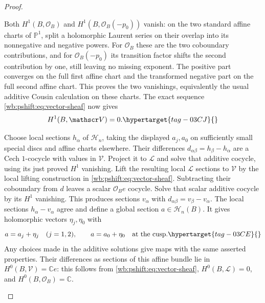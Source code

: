 \begin{proof}
\begin{enumerate}[label=\arabic*.,leftmargin=*]
Both $H^1(B,\mathcal O_B)$ and
$H^1(B,\mathcal O_B(-p_0))$ vanish: on the two standard affine
charts of $\mathbb P^1$, split a holomorphic Laurent series on
their overlap into its nonnegative and negative powers. For
$\mathcal O_B$ these are the two coboundary contributions, and
for $\mathcal O_B(-p_0)$ its transition factor shifts the second
contribution by one, still leaving no missing exponent. The positive
part converges on the full first affine chart and the transformed
negative part on the full second affine chart. This proves the two
vanishings, equivalently the usual additive Cousin calculation on
these charts. The exact sequence \eqref{wb:pshift:eq:vector-sheaf} now gives
\begin{equation}
                             H^1(B,\mathscr V)=0.
 \hypertarget{tag-03CJ}{}\label{wb:pshift:eq:no-analytic-obstruction}
\end{equation}

Choose
local sections $h_\alpha$ of $\mathscr H_n$, taking the displayed
$a_j,a_0$ on sufficiently small special discs and affine charts
elsewhere. Their differences $d_{\alpha\beta}=h_\beta-h_\alpha$
are a Cech $1$-cocycle with values in $\mathscr V$. Project it to
$\mathcal L$ and solve that additive cocycle, using its just proved
$H^1$ vanishing. Lift the resulting local $\mathcal L$ sections to
$\mathscr V$ by the local lifting construction in \eqref{wb:pshift:eq:vector-sheaf}. Subtracting
their coboundary from $d$ leaves a scalar $\mathcal O_Be$ cocycle.
Solve that scalar additive cocycle by its $H^1$ vanishing. This
produces sections $v_\alpha$ with
$d_{\alpha\beta}=v_\beta-v_\alpha$. The local sections
$h_\alpha-v_\alpha$ agree and define a global section
$a\in\mathscr H_n(B)$. It gives holomorphic vectors $\eta_j,\eta_0$ with
\begin{equation}
 a=a_j+\eta_j\quad(j=1,2),\qquad a=a_0+\eta_0
                              \quad\hbox{at the cusp}.
 \hypertarget{tag-03CE}{}\label{wb:pshift:eq:global-correction}
\end{equation}
Any choices made in the additive solutions give maps with the same
asserted properties. Their differences as sections of this affine
bundle lie in $H^0(B,\mathscr V)=\mathbb C e$: this follows from
\eqref{wb:pshift:eq:vector-sheaf}, $H^0(B,\mathcal L)=0$, and $H^0(B,\mathcal O_B)=\mathbb C$.


\end{enumerate}
\end{proof}

